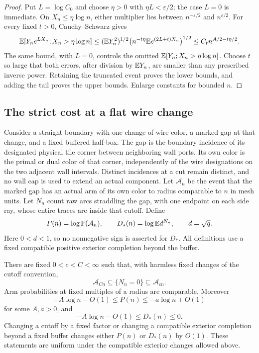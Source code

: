 \begin{proof}
Put \(L=\log C_0\) and choose \(\eta>0\) with
\(\eta L<\varepsilon/2\); the case \(L=0\) is immediate.
On \(X_n\le\eta\log n\), either multiplier lies between
\(n^{-\varepsilon/2}\) and \(n^{\varepsilon/2}\).
For every fixed \(t>0\), Cauchy--Schwarz gives
\[
 \mathbb E[Y_ne^{LX_n};X_n>\eta\log n]
 \le (\mathbb E Y_n^2)^{1/2}
      \bigl(n^{-t\eta}\mathbb E e^{(2L+t)X_n}\bigr)^{1/2}
 \le C_t n^{A/2-t\eta/2}.
\]
The same bound, with \(L=0\), controls the omitted
\(\mathbb E[Y_n;X_n>\eta\log n]\).  Choose \(t\) so large that
both errors, after division by \(\mathbb E Y_n\), are smaller
than any prescribed inverse power.  Retaining the truncated
event proves the lower bounds, and adding the tail proves
the upper bounds.  Enlarge constants for bounded \(n\).
\end{proof}

\subsection{The strict cost at a flat wire change}

Consider a straight boundary with one change of wire color,
a marked gap at that change, and a fixed buffered half-box.
The gap is the boundary incidence of its designated physical tile
corner between neighboring wall ports.  Its own color is the primal
or dual color of that corner, independently of the wire designations
on the two adjacent wall intervals.  Distinct incidences at a cut
remain distinct, and no wall cap is used to extend an actual component.
Let \(\mathcal A_n\) be the event that the marked gap has an
actual arm of its own color to radius comparable to \(n\)
in mesh units.  Let \(N_n\) count raw arcs straddling the
gap, with one endpoint on each side ray, whose entire traces
are inside that cutoff.  Define
\begin{equation}\label{angular:flat-cost-definitions}
 P(n)=\log\mathbb P(\mathcal A_n),\qquad
 D_*(n)=\log\mathbb E d^{N_n},\qquad d=\sqrt q.
\end{equation}
Here \(0<d<1\), so no nonnegative sign is asserted for \(D_*\).
All definitions use a fixed compatible positive exterior
completion beyond the buffer.

\begin{lemma}
\label{angular:arm-straddle}
\label{angular:flat-costs}
There are fixed \(0<c<C<\infty\) such that, with harmless
fixed changes of the cutoff convention,
\begin{equation}\label{angular:arm-straddle-inclusions}
 \mathcal A_{Cn}\subseteq\{N_n=0\}\subseteq\mathcal A_{cn}.
\end{equation}
Arm probabilities at fixed multiples of a radius are
comparable.  Moreover
\[
-A\log n-O(1)\le P(n)\le-a\log n+O(1)
\]
for some \(A,a>0\), and
\[
 -A\log n-O(1)\le D_*(n)\le0.
\]
Changing a cutoff by a fixed factor or changing a compatible
exterior completion beyond a fixed buffer changes either
\(P(n)\) or \(D_*(n)\) by \(O(1)\).
These statements are uniform under the compatible exterior
changes allowed above.
\end{lemma}

